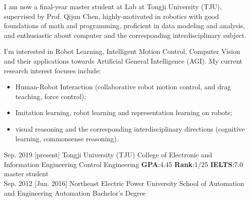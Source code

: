 \documentclass{resume}
\begin{document}
\makeheader

I am now a final-year master student at  Lab at Tongji University (TJU), supervised by Prof.  {Qijun Chen}, highly-motivated in robotics with good foundations of math and programming, proficient in data modeling and analysis, and enthusiastic about computer and the corresponding interdisciplinary subject.

I'm interested in Robot Learning, Intelligent Motion Control, Computer Vision and their applications towards Artificial General Intelligence (AGI). My current research interest focuses include:
\begin{itemize}
  \item Human-Robot Interaction (collaborative robot motion control, and drag teaching, force control);
  \item Imitation learning, robot learning and representation learning on robots;
  \item visual reasoning and the corresponding interdisciplinary directions (cognitive learning, commonsense reasoning).\\
\end{itemize}

\begin{educations}
  \education%
    {Sep. 2019}%
    [present]%
    {Tongji University (TJU)}%
    {College of Electronic and Information Engineering}%
    {Control Engineering \quad \textbf{GPA}:4.45 \quad \textbf{Rank}:1/25 \quad \textbf{IELTS}:7.0}%
    {master student}\\

  \separator{0.5ex}
  \education%
    {Sep. 2012}%
    [Jun. 2016]%
    {Northeast Electric Power University}%
    {School of Automation and Engineering}%
    {Automation}%
    {Bachelor's Degree}
    
\end{educations}
\end{document}
